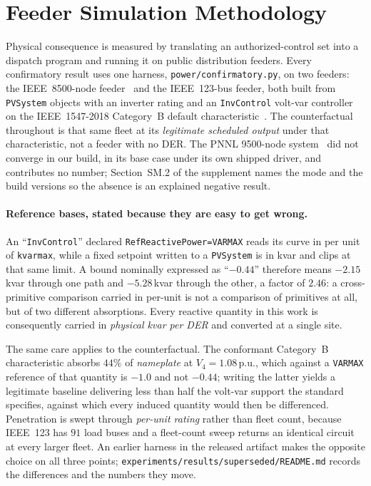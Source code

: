 \section{Feeder Simulation Methodology}\label{sec:feeder}

Physical consequence is measured by translating an authorized-control set into a dispatch program
and running it on public distribution feeders. Every confirmatory result uses one harness,
\texttt{power/confirmatory.py}, on two feeders: the IEEE~8500-node feeder~\cite{arritt2010ieee8500}
and the IEEE~123-bus feeder, both built from \texttt{PVSystem} objects with an inverter rating and
an \texttt{InvControl} volt-var controller on the IEEE~1547-2018 Category~B default
characteristic~\cite{ieee1547-2018}. The counterfactual throughout is that same fleet at its
\emph{legitimate scheduled output} under that characteristic, not a feeder with no DER. The PNNL
9500-node system~\cite{anderson2022ninethousand} did not converge in our build, in its base case
under its own shipped driver, and contributes no number; Section~SM.2 of the supplement names the
mode and the build versions so the absence is an explained negative result.

\paragraph{Reference bases, stated because they are easy to get wrong.}
An ``\texttt{InvControl}'' declared \texttt{RefReactivePower=VARMAX} reads its curve in per unit
of \texttt{kvarmax}, while a fixed setpoint written to a \texttt{PVSystem} is in kvar and clips at
that same limit. A bound nominally expressed as ``$-0.44$'' therefore means $-2.15$\,kvar through
one path and $-5.28$\,kvar through the other, a factor of $2.46$: a cross-primitive comparison
carried in per-unit is not a comparison of primitives at all, but of two different absorptions.
Every reactive quantity in this work is consequently carried in \emph{physical kvar per DER} and
converted at a single site.

The same care applies to the counterfactual. The conformant Category~B characteristic absorbs
$44\%$ of \emph{nameplate} at $V_4 = 1.08$\,p.u., which against a \texttt{VARMAX} reference of
that quantity is $-1.0$ and not $-0.44$; writing the latter yields a legitimate baseline
delivering less than half the volt-var support the standard specifies, against which every induced
quantity would then be differenced. Penetration is swept through \emph{per-unit rating} rather
than fleet count, because IEEE~123 has $91$ load buses and a fleet-count sweep returns an identical
circuit at every larger fleet. An earlier harness in the released artifact makes the opposite
choice on all three points; \texttt{experiments/results/superseded/README.md} records the
differences and the numbers they move.


